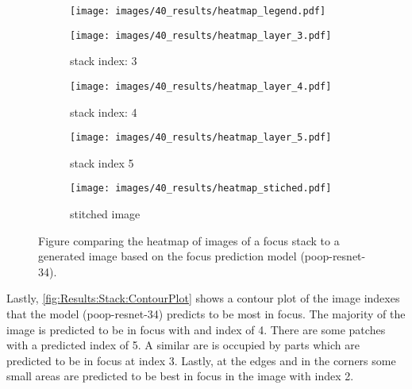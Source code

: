 \begin{figure}
    \centering
    \begin{subfigure}[b]{0.5\textwidth}
        \centering
        \texttt{[image: images/40\_results/heatmap\_legend.pdf]}
    \end{subfigure}
    \begin{subfigure}[b]{0.45\textwidth}
        \centering
        \texttt{[image: images/40\_results/heatmap\_layer\_3.pdf]}
        \caption{stack index: 3}
        \label{fig:Results:Stack:HeatMap:Stack3}
        \vspace{1em}
    \end{subfigure}%
    \begin{subfigure}[b]{0.45\textwidth}
        \centering
        \texttt{[image: images/40\_results/heatmap\_layer\_4.pdf]}
        \caption{stack index: 4}
        \label{fig:Results:Stack:HeatMap:Stack4}
        \vspace{1em}
    \end{subfigure}
    \par
    \begin{subfigure}[b]{0.45\textwidth}
        \centering
        \texttt{[image: images/40\_results/heatmap\_layer\_5.pdf]}
        \caption{stack index 5}
        \label{fig:Results:Stack:HeatMap:Stack5}
    \end{subfigure}%
    \begin{subfigure}[b]{0.45\textwidth}
        \centering
        \texttt{[image: images/40\_results/heatmap\_stiched.pdf]}
        \caption{stitched image}
        \label{fig:Results:Stack:HeatMap:Stiched}
    \end{subfigure}
    \caption{Figure comparing the heatmap of images of a focus stack to a generated image based on the focus prediction model (\acs{poop}-\acs{resnet}-34).}
    \label{fig:Results:Stack:HeatMap}
\end{figure}

Lastly, \autoref{fig:Results:Stack:ContourPlot} shows a contour plot of the image indexes that the model (\acs{poop}-\acs{resnet}-34) predicts to be most in focus. The majority of the image is predicted to be in focus with and index of 4. There are some patches with a predicted index of 5. A similar are is occupied by parts which are predicted to be in focus at index 3. Lastly, at the edges and in the corners some small areas are predicted to be best in focus in the image with index 2. 

